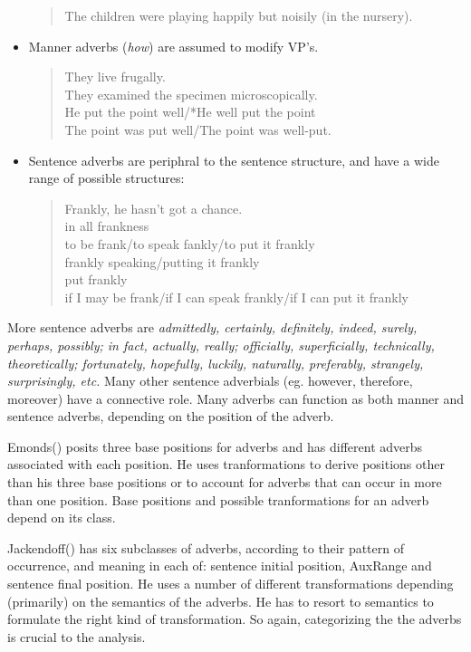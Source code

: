 \begin{itemize}
\begin{verse}
      The children were playing happily but noisily (in the nursery).
     \end{verse}
 \item Manner adverbs ({\em how\/}) are assumed to modify VP's.
     \begin{verse}
      They live frugally.\\
      They examined the specimen microscopically.\\
      He put the point well/*He well put the point \\
      The point was put well/The point was well-put.
     \end{verse}     
 \item Sentence adverbs are periphral to the sentence structure, and have
       a wide range of possible structures:  
     \begin{verse}
      Frankly, he hasn't got a chance.\\
      in all frankness \\
      to be frank/to speak fankly/to put it frankly \\
      frankly speaking/putting it frankly \\
      put frankly \\
      if I may be frank/if I can speak frankly/if I can put it frankly
     \end{verse}
\end{itemize}
       More sentence adverbs are
       {\em admittedly, certainly, definitely, indeed, surely, perhaps,
          possibly; in fact, actually, really; officially,
          superficially, technically, theoretically; fortunately,
          hopefully, luckily, naturally, preferably, strangely,
          surprisingly, etc.}
          Many other sentence adverbials (eg. however, therefore,
          moreover) have a connective role.
Many adverbs can function as both manner and sentence adverbs,
depending on the position of the adverb. 

Emonds() posits three base positions for adverbs
and has different adverbs associated with each position. He uses
tranformations to derive positions other than his three base positions
or to account for adverbs that can occur in more than one position.
Base positions and possible tranformations for an adverb depend on its
class.

Jackendoff() has six subclasses of adverbs,
according to their pattern of occurrence, and meaning in each of: sentence
initial position, AuxRange and sentence final position.  He uses a
number of different transformations depending (primarily) on the
semantics of the adverbs. He has to resort to semantics to formulate
the right kind of transformation. So again, categorizing the the
adverbs is crucial to the analysis.

